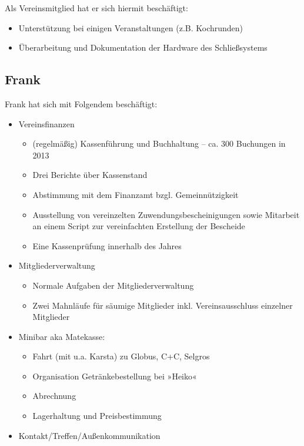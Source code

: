 \documentclass[10pt,DIV16]{scrartcl}
\begin{document}
Als Vereinsmitglied hat er sich hiermit beschäftigt: 

\begin{itemize}
    \item Unterstützung bei einigen Veranstaltungen (z.B. Kochrunden)
    \item Überarbeitung und Dokumentation der Hardware des Schließsystems
\end{itemize}

\subsection{Frank}

Frank hat sich mit Folgendem beschäftigt:

\begin{itemize}
	\item Vereinsfinanzen
		\begin{itemize}
			\item (regelmäßig) Kassenführung und Buchhaltung --
				  ca. 300 Buchungen in 2013
			\item Drei Berichte über Kassenstand
			\item Abstimmung mit dem Finanzamt bzgl. Gemeinnützigkeit
			\item Ausstellung von vereinzelten Zuwendungsbescheinigungen
				  sowie Mitarbeit an einem Script zur vereinfachten
				  Erstellung der Bescheide
			\item Eine Kassenprüfung innerhalb des Jahres
		\end{itemize}
	\item Mitgliederverwaltung
		\begin{itemize}
			\item Normale Aufgaben der Mitgliederverwaltung
			\item Zwei Mahnläufe für säumige Mitglieder inkl.
				  Vereinsausschluss einzelner Mitglieder
		\end{itemize}
	\item Minibar aka Matekasse:
		\begin{itemize}
			\item Fahrt (mit u.a. Karsta) zu Globus, C+C, Selgros
			\item Organisation Getränkebestellung bei »Heiko«
			\item Abrechnung
			\item Lagerhaltung und Preisbestimmung
		\end{itemize}
	\item Kontakt/Treffen/Außenkommunikation

\end{itemize}
\end{document}
